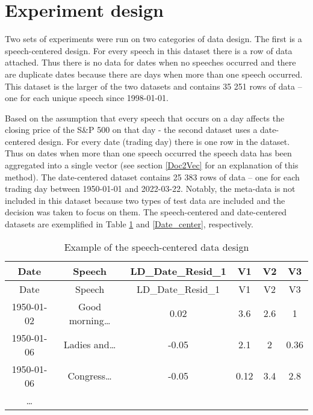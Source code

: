 \documentclass[11pt,preprint, authoryear]{elsarticle}
\numberwithin{equation}{section}
\numberwithin{figure}{section}
\numberwithin{table}{section}
\begin{document}
\hypertarget{experiment-design}{%
\section{Experiment design}\label{experiment-design}}

Two sets of experiments were run on two categories of data design. The
first is a speech-centered design. For every speech in this dataset
there is a row of data attached. Thus there is no data for dates when no
speeches occurred and there are duplicate dates because there are days
when more than one speech occurred. This dataset is the larger of the
two datasets and contains 35 251 rows of data -- one for each unique
speech since 1998-01-01.

Based on the assumption that every speech that occurs on a day affects
the closing price of the S\&P 500 on that day - the second dataset uses
a date-centered design. For every date (trading day) there is one row in
the dataset. Thus on dates when more than one speech occurred the speech
data has been aggregated into a single vector (see section \ref{Doc2Vec}
for an explanation of this method). The date-centered dataset contains
25 383 rows of data -- one for each trading day between 1950-01-01 and
2022-03-22. Notably, the meta-data is not included in this dataset
because two types of test data are included and the decision was taken
to focus on them. The speech-centered and date-centered datasets are
exemplified in Table \ref{Speech_center} and \ref{Date_center},
respectively.

\begin{longtable}[]{@{}cccccc@{}}
\caption{Example of the speech-centered data design
\label{Speech_center}}\tabularnewline
\toprule()
Date & Speech & LD\_Date\_Resid\_1 & V1 & V2 & V3 \\
\midrule()
\endfirsthead
\toprule()
Date & Speech & LD\_Date\_Resid\_1 & V1 & V2 & V3 \\
\midrule()
\endhead
1950-01-02 & Good morning\ldots{} & 0.02 & 3.6 & 2.6 & 1 \\
1950-01-06 & Ladies and\ldots{} & -0.05 & 2.1 & 2 & 0.36 \\
1950-01-06 & Congress\ldots{} & -0.05 & 0.12 & 3.4 & 2.8 \\
\ldots{} & & & & & \\
\bottomrule()
\end{longtable}
\end{document}
